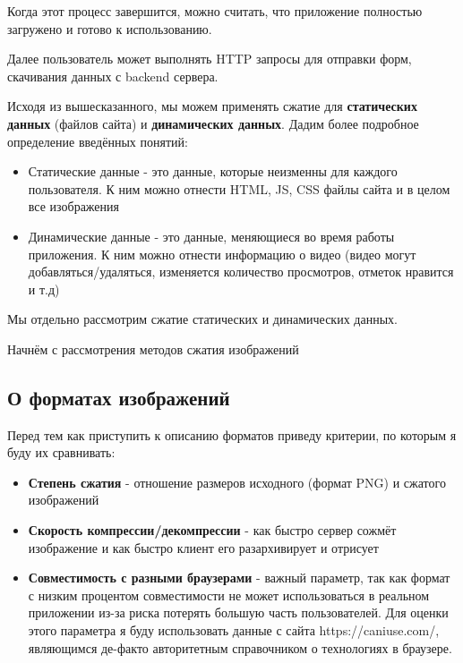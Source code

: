 \documentclass[12pt]{article}
\begin{document}
Когда этот процесс завершится, можно считать, что приложение полностью загружено и готово к использованию.

Далее пользователь может выполнять HTTP запросы для отправки форм, скачивания данных с backend сервера.

Исходя из вышесказанного, мы можем применять сжатие для \textbf{статических данных} (файлов сайта)
и \textbf{динамических данных}. Дадим более подробное определение введённых понятий:

\begin{itemize}
    \item Статические данные - это данные, которые неизменны для каждого пользователя. К ним можно отнести HTML, JS, CSS файлы сайта и в целом все изображения
    \item Динамические данные - это данные, меняющиеся во время работы приложения.
          К ним можно отнести информацию о видео (видео могут добавляться/удаляться, изменяется количество просмотров, отметок нравится и т.д)
\end{itemize}

Мы отдельно рассмотрим сжатие статических и динамических данных.

Начнём с рассмотрения методов сжатия изображений

\subsection{О форматах изображений}

Перед тем как приступить к описанию форматов приведу критерии, по которым я буду их сравнивать:

\begin{itemize}
    \item \textbf{Степень сжатия} - отношение размеров исходного (формат PNG) и сжатого изображений
    \item \textbf{Скорость компрессии/декомпрессии} - как быстро сервер сожмёт изображение и как быстро клиент его разархивирует и отрисует
    \item \textbf{Совместимость с разными браузерами} - важный параметр,
          так как формат с низким процентом совместимости не может использоваться в реальном приложении
          из-за риска потерять большую часть пользователей. Для оценки этого параметра
          я буду использовать данные с сайта https://caniuse.com/, являющимся де-факто авторитетным справочником
          о технологиях в браузере.
\end{itemize}
\end{document}
